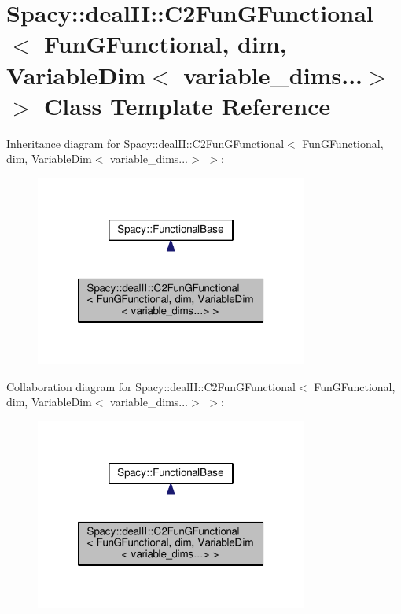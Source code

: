 \hypertarget{classSpacy_1_1dealII_1_1C2FunGFunctional_3_01FunGFunctional_00_01dim_00_01VariableDim_3_01variable__dims_8_8_8_4_01_4}{\section{Spacy\-:\-:deal\-I\-I\-:\-:C2\-Fun\-G\-Functional$<$ Fun\-G\-Functional, dim, Variable\-Dim$<$ variable\-\_\-dims...$>$ $>$ Class Template Reference}
\label{classSpacy_1_1dealII_1_1C2FunGFunctional_3_01FunGFunctional_00_01dim_00_01VariableDim_3_01variable__dims_8_8_8_4_01_4}
}


Inheritance diagram for Spacy\-:\-:deal\-I\-I\-:\-:C2\-Fun\-G\-Functional$<$ Fun\-G\-Functional, dim, Variable\-Dim$<$ variable\-\_\-dims...$>$ $>$\-:
\nopagebreak
\begin{figure}[H]
\begin{center}
\leavevmode
\includegraphics[width=254pt]{classSpacy_1_1dealII_1_1C2FunGFunctional_3_01FunGFunctional_00_01dim_00_01VariableDim_3_01variabdd2f0a36ce4d88162e913acd09d473fb}
\end{center}
\end{figure}


Collaboration diagram for Spacy\-:\-:deal\-I\-I\-:\-:C2\-Fun\-G\-Functional$<$ Fun\-G\-Functional, dim, Variable\-Dim$<$ variable\-\_\-dims...$>$ $>$\-:
\nopagebreak
\begin{figure}[H]
\begin{center}
\leavevmode
\includegraphics[width=254pt]{classSpacy_1_1dealII_1_1C2FunGFunctional_3_01FunGFunctional_00_01dim_00_01VariableDim_3_01variab838214f93d7ab853f70291fd32313117}
\end{center}
\end{figure}
